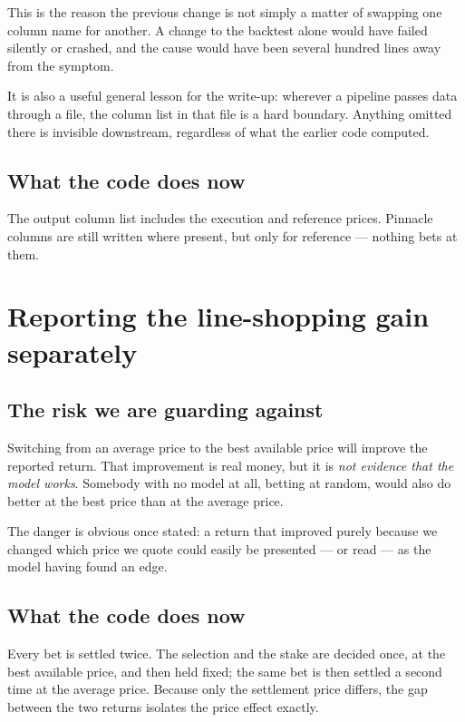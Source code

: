 \documentclass[11pt,a4paper]{article}
\begin{document}
This is the reason the previous change is not simply a matter of swapping
one column name for another. A change to the backtest alone would have failed
silently or crashed, and the cause would have been several hundred lines away
from the symptom.

It is also a useful general lesson for the write-up: wherever a pipeline
passes data through a file, the column list in that file is a hard boundary.
Anything omitted there is invisible downstream, regardless of what the
earlier code computed.

\subsection{What the code does now}

The output column list includes the execution and reference prices. Pinnacle
columns are still written where present, but only for reference --- nothing
bets at them.

\section{Reporting the line-shopping gain separately}
\label{sec:shopping}

\subsection{The risk we are guarding against}

Switching from an average price to the best available price will improve the
reported return. That improvement is real money, but it is \emph{not evidence
that the model works}. Somebody with no model at all, betting at random,
would also do better at the best price than at the average price.

The danger is obvious once stated: a return that improved purely because we
changed which price we quote could easily be presented --- or read --- as the
model having found an edge.

\subsection{What the code does now}

Every bet is settled twice. The selection and the stake are decided once, at
the best available price, and then held fixed; the same bet is then settled a
second time at the average price. Because only the settlement price differs,
the gap between the two returns isolates the price effect exactly.
\end{document}
